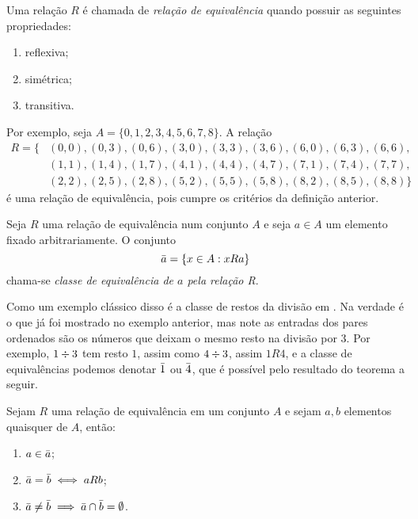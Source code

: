 \documentclass[../main.tex]{subfiles}
\begin{document}
\begin{defi}
    Uma relação $R$ é chamada de \emph{relação de equivalência} quando possuir as seguintes propriedades:
    \begin{enumerate}[label=(\roman*)]
        \item reflexiva;
        \item simétrica;
        \item transitiva.
    \end{enumerate}
\end{defi}

Por exemplo, seja $A = \{0,1,2,3,4,5,6,7,8\}$. A relação 
\begin{align}
    R = \{ & (0,0), (0,3), (0,6), (3,0), (3,3), (3,6), (6,0),(6,3), (6,6), \\
& (1,1), (1,4), (1,7), (4,1), (4,4), (4,7), (7,1), (7,4), (7,7), \\
& (2,2), (2,5), (2,8), (5,2), (5,5), (5,8), (8,2), (8,5), (8,8) \}
\end{align}
é uma relação de equivalência, pois cumpre os critérios da definição anterior.

\begin{defi}
    Seja $R$ uma relação de equivalência num conjunto $A$ e seja $a \in A$ um elemento fixado arbitrariamente. O conjunto \\
    $$\Bar{a} = \{x \in A : xRa\}$$
    chama-se \emph{classe de equivalência de $a$ pela relação R}.
\end{defi}
Como um exemplo clássico disso é a classe de restos da divisão em \N. Na verdade é o que já foi mostrado no exemplo anterior, mas note as entradas dos pares ordenados são os números que deixam o mesmo resto na divisão por $3$. Por exemplo, $1 \divisionsymbol 3$ tem resto $1$, assim como $4 \divisionsymbol 3$, assim $1R4$, e a classe de equivalências podemos denotar $\Bar{1}$ ou $\Bar{4}$, que é possível pelo resultado do teorema a seguir.

\begin{teo}
    Sejam $R$ uma relação de equivalência em um conjunto $A$ e sejam $a,b$ elementos quaisquer de $A$, então:
    \begin{enumerate}[label=(\roman*)]
        \item $a \in \Bar{a}$;
        \item $\Bar{a} = \Bar{b} \iff aRb$;
        \item $\Bar{a} \neq \Bar{b} \implies \Bar{a} \cap \Bar{b} = \emptyset $.
    \end{enumerate}
\end{teo}
\end{document}
